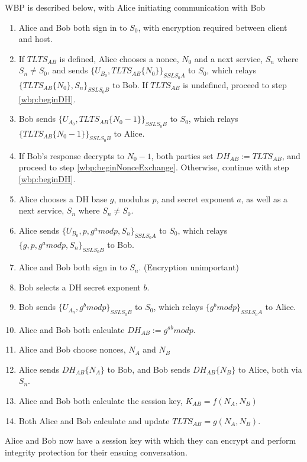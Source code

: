 \documentclass[twoside]{article}
\begin{document}
\begin{multicols}{2}
WBP is described below, with Alice initiating communication with Bob
\begin{enumerate}
\item Alice and Bob both sign in to $S_0$, with encryption required between client and host.
\item If $TLTS_{AB}$ is defined, Alice chooses a nonce, $N_0$ and a next service, $S_n$ where $S_n \neq S_0$, and sends $\{U_{B_0}, TLTS_{AB}\{N_0\}\}_{SSL S_0 A}$ to $S_0$, which relays $\{TLTS_{AB}\{N_0\}, S_n\}_{SSL S_0 B}$ to Bob.  If $TLTS_{AB}$ is undefined, proceed to step \ref{wbp:beginDH}.
\item Bob sends $\{U_{A_0}, TLTS_{AB}\{N_0-1\}\}_{SSL S_0 B}$ to $S_0$, which relays $\{TLTS_{AB}\{N_0-1\}\}_{SSL S_0 B}$ to Alice.
\item If Bob's response decrypts to $N_0-1$, both parties set $DH_{AB}:=TLTS_{AB}$, and proceed to step \ref{wbp:beginNonceExchange}.  Otherwise, continue with step \ref{wbp:beginDH}.
\item \label{wbp:beginDH} Alice chooses a DH base $g$, modulus $p$, and secret exponent $a$, as well as a next service, $S_n$ where $S_n \neq S_0$.
\item Alice sends $\{U_{B_0}, p, g^a mod p, S_n\}_{SSL S_0 A}$ to $S_0$, which relays $\{g, p, g^a mod p, S_n\}_{SSL S_0 B}$ to Bob.
\item Alice and Bob both sign in to $S_n$.  (Encryption unimportant)
\item Bob selects a DH secret exponent $b$.
\item Bob sends $\{U_{A_n}, g^b mod p\}_{SSL S_0 B}$ to $S_0$, which relays $\{g^b mod p\}_{SSL S_0 A}$ to Alice.
\item Alice and Bob both calculate $DH_{AB}:=g^{ab} mod p$.
\item \label{wbp:beginNonceExchange} Alice and Bob choose nonces, $N_A$ and $N_B$
\item Alice sends $DH_{AB}\{N_A\}$ to Bob, and Bob sends $DH_{AB}\{N_B\}$ to Alice, both via $S_n$.
\item Alice and Bob both calculate the session key, $K_{AB}=f(N_A, N_B)$
\item Both Alice and Bob calculate and update $TLTS_{AB}=g(N_A, N_B)$.
\end{enumerate}

Alice and Bob now have a session key with which they can encrypt and perform integrity protection for their ensuing conversation.


\end{multicols}
\end{document}

